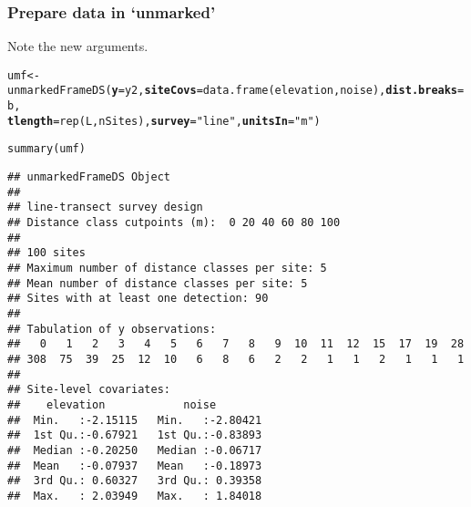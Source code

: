 \documentclass[color=usenames,dvipsnames]{beamer}\usepackage[]{graphicx}\usepackage[]{xcolor}
\makeatletter
\newcommand{\hlsng}[1]{\textcolor[rgb]{0.749,0.012,0.012}{#1}}%
\newcommand{\hldef}[1]{\textcolor[rgb]{0,0,0}{#1}}%
\newcommand{\hlkwb}[1]{\textcolor[rgb]{0,0.341,0.682}{#1}}%
\newcommand{\hlkwc}[1]{\textcolor[rgb]{0,0,0}{\textbf{#1}}}%
\newcommand{\hlkwd}[1]{\textcolor[rgb]{0.004,0.004,0.506}{#1}}%
\newenvironment{kframe}{%
 \def\at@end@of@kframe{}%
 \ifinner\ifhmode%
  \def\at@end@of@kframe{\end{minipage}}%
  \begin{minipage}{\columnwidth}%
 \fi\fi%
 \def\FrameCommand##1{\hskip\@totalleftmargin \hskip-\fboxsep
 \colorbox{shadecolor}{##1}\hskip-\fboxsep
     \hskip-\linewidth \hskip-\@totalleftmargin \hskip\columnwidth}%
 \MakeFramed {\advance\hsize-\width
   \@totalleftmargin\z@ \linewidth\hsize
   \@setminipage}}%
 {\par\unskip\endMakeFramed%
 \at@end@of@kframe}
\newenvironment{knitrout}{}{} %
\makeatother
\begin{document}
\begin{frame}[fragile]
  \frametitle{Prepare data in `unmarked'}
  \small
  Note the new arguments.
  \vspace{-6pt}
\begin{knitrout}\tiny
{}\color{fgcolor}\begin{kframe}
\begin{alltt}
\hldef{umf} \hlkwb{<-} \hlkwd{unmarkedFrameDS}\hldef{(}\hlkwc{y}\hldef{=y2,} \hlkwc{siteCovs}\hldef{=}\hlkwd{data.frame}\hldef{(elevation,noise),} \hlkwc{dist.breaks}\hldef{=b,}
                       \hlkwc{tlength}\hldef{=}\hlkwd{rep}\hldef{(L, nSites),} \hlkwc{survey}\hldef{=}\hlsng{"line"}\hldef{,} \hlkwc{unitsIn}\hldef{=}\hlsng{"m"}\hldef{)}
\end{alltt}
\end{kframe}
\end{knitrout}
\pause
\begin{knitrout}\tiny
{}\color{fgcolor}\begin{kframe}
\begin{alltt}
\hlkwd{summary}\hldef{(umf)}
\end{alltt}
\begin{verbatim}
## unmarkedFrameDS Object
## 
## line-transect survey design
## Distance class cutpoints (m):  0 20 40 60 80 100 
## 
## 100 sites
## Maximum number of distance classes per site: 5 
## Mean number of distance classes per site: 5 
## Sites with at least one detection: 90 
## 
## Tabulation of y observations:
##   0   1   2   3   4   5   6   7   8   9  10  11  12  15  17  19  28 
## 308  75  39  25  12  10   6   8   6   2   2   1   1   2   1   1   1 
## 
## Site-level covariates:
##    elevation            noise         
##  Min.   :-2.15115   Min.   :-2.80421  
##  1st Qu.:-0.67921   1st Qu.:-0.83893  
##  Median :-0.20250   Median :-0.06717  
##  Mean   :-0.07937   Mean   :-0.18973  
##  3rd Qu.: 0.60327   3rd Qu.: 0.39358  
##  Max.   : 2.03949   Max.   : 1.84018
\end{verbatim}
\end{kframe}
\end{knitrout}
\end{frame}
\end{document}
